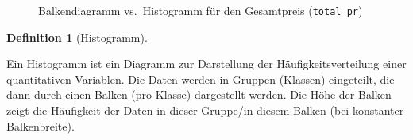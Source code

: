 \documentclass[
  letterpaper,
  twoside,
  open=any]{scrbook}
\theoremstyle{definition}
\newtheorem{definition}{Definition}[chapter]
\theoremstyle{definition}
\theoremstyle{definition}
\theoremstyle{remark}
\begin{document}
\begin{figure}

\begin{minipage}{0.50\linewidth}



\end{minipage}%
%
\begin{minipage}{0.50\linewidth}



\end{minipage}%

\caption{\label{fig-balken-hist}Balkendiagramm vs.~Histogramm für den
Gesamtpreis (\texttt{total\_pr})}

\end{figure}%

\begin{definition}[Histogramm]\protect\hypertarget{def-histogramm}{}\label{def-histogramm}

Ein Histogramm ist ein Diagramm zur Darstellung der
Häufigkeitsverteilung einer quantitativen Variablen. Die Daten werden in
Gruppen (Klassen) eingeteilt, die dann durch einen Balken (pro Klasse)
dargestellt werden. Die Höhe der Balken zeigt die Häufigkeit der Daten
in dieser Gruppe/in diesem Balken (bei konstanter Balkenbreite).

\end{definition}
\end{document}
